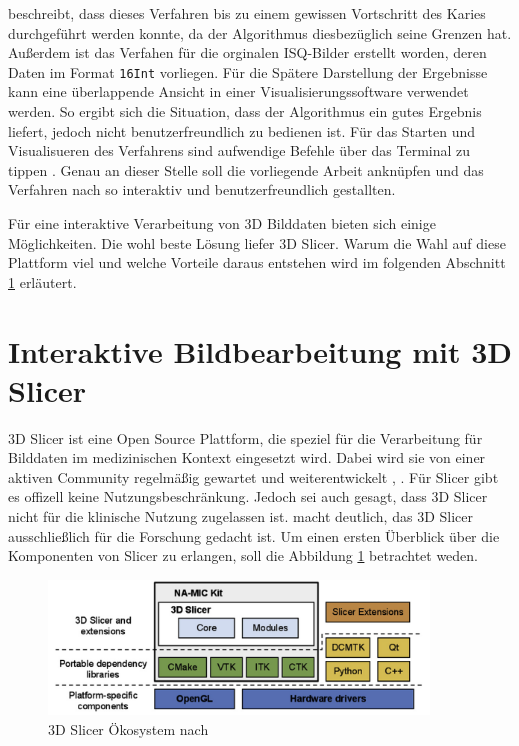 \citet{hoffmann2020} beschreibt, dass dieses Verfahren bis zu einem gewissen Vortschritt
des Karies durchgeführt werden konnte, da der Algorithmus diesbezüglich seine
Grenzen hat. Außerdem ist das Verfahen für die orginalen ISQ-Bilder erstellt worden,
deren Daten im Format \texttt{16Int} vorliegen. Für die Spätere Darstellung der
Ergebnisse kann eine überlappende Ansicht in einer Visualisierungssoftware
verwendet werden. So ergibt sich die Situation, dass der Algorithmus ein gutes
Ergebnis liefert, jedoch nicht benutzerfreundlich zu bedienen ist. Für das
Starten und Visualisueren des Verfahrens sind aufwendige Befehle über das
Terminal zu tippen \citep[vgl.][Seite 53]{hoffmann2020}. Genau an dieser Stelle soll
die vorliegende Arbeit anknüpfen und das Verfahren nach \citet{hoffmann2020} so
interaktiv und benutzerfreundlich gestallten.

Für eine interaktive Verarbeitung von 3D Bilddaten bieten sich einige
Möglichkeiten. Die wohl beste Lösung liefer 3D Slicer. Warum die Wahl auf diese
Plattform viel und welche Vorteile daraus entstehen wird im folgenden Abschnitt
\ref{sec:3d_slicer} erläutert.

\pagebreak

\section{Interaktive Bildbearbeitung mit 3D Slicer}
\label{sec:3d_slicer} 3D Slicer ist eine Open Source Plattform, die speziel für
die Verarbeitung für Bilddaten im medizinischen Kontext eingesetzt wird. Dabei wird
sie von einer aktiven Community regelmäßig gewartet und weiterentwickelt \citep[vgl.][]{slicer2024},
\citep[vgl.][]{fedorov2012slicer}. Für Slicer gibt es offizell keine Nutzungsbeschränkung.
Jedoch sei auch gesagt, dass 3D Slicer nicht für die klinische Nutzung zugelassen
ist. \citet{fedorov2012slicer} macht deutlich, das 3D Slicer ausschließlich für
die Forschung gedacht ist. Um einen ersten Überblick über die Komponenten von Slicer
zu erlangen, soll die Abbildung \ref{fig:3d_slicer_oekosystem} betrachtet weden.

\begin{figure}[h]
	\centering
	\includegraphics[width=0.9\textwidth]{img/3d_slicer_overview.jpg}
	\caption{3D Slicer Ökosystem nach \citet[Seite 1326]{fedorov2012slicer}}
	\label{fig:3d_slicer_oekosystem}
\end{figure}

